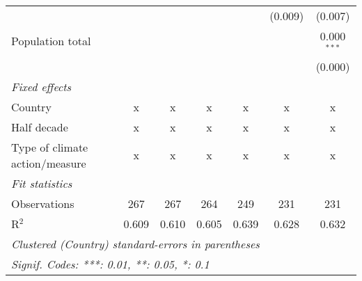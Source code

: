 \begin{tabular}{lcccccc}
                                                     &         &         &         &               & (0.009) & (0.007)\\   
   Population total                                  &         &         &         &               &         & 0.000$^{***}$\\   
                                                     &         &         &         &               &         & (0.000)\\   
   \emph{Fixed effects}\\
   Country                                           & x       & x       & x       & x             & x       & x\\  
   Half decade                                       & x       & x       & x       & x             & x       & x\\  
   Type of climate action/measure                    & x       & x       & x       & x             & x       & x\\  
   \midrule \emph{Fit statistics}\\
   Observations                                      & 267     & 267     & 264     & 249           & 231     & 231\\  
   R$^2$                                             & 0.609   & 0.610   & 0.605   & 0.639         & 0.628   & 0.632\\  
   \midrule
   \multicolumn{7}{l}{\emph{Clustered (Country) standard-errors in parentheses}}\\
   \multicolumn{7}{l}{\emph{Signif. Codes: ***: 0.01, **: 0.05, *: 0.1}}\\
\end{tabular}
\par\endgroup


